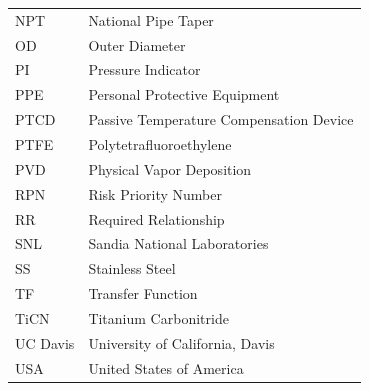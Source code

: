 \documentclass[12pt, letterpaper]{report}%
\newcounter{mycounter}           %
\newcounter{sub}[mycounter]      %
\newcommand{\device}{PTCD}
\begin{document}
\begin{longtable}{@{} l p{} @{}}
		NPT			& National Pipe Taper \\
		OD			& Outer Diameter \\
		PI			& Pressure Indicator \\
		PPE			& Personal Protective Equipment \\
		PTCD    & Passive Temperature Compensation Device \\
		PTFE		& Polytetrafluoroethylene \\ 
		PVD			& Physical Vapor Deposition \\ 
		RPN			& Risk Priority Number \\
		RR      & Required Relationship \\
		SNL     & Sandia National Laboratories \\
		SS			& Stainless Steel \\
		TF      & Transfer Function \\
		TiCN		& Titanium Carbonitride \\
		UC Davis & University of California, Davis \\
		USA			& United States of America \\
	\end{longtable}

\newpage  %


\begin{abstract}

	Modern engineering constantly requires advances in technological precision and reliability.
	Sandia National Laboratories, a United States security and energy research facility, conducts many experiments that depend on submillimeter-precision flow control of high-pressure hydrogen gas.
	Their experiments are sensitive to temperature fluctuations; the flow must be adjusted for various reasons to compensate for these changes.
	However, power and space constraints prohibit the use of electronic power or computer control systems, and existing passive flow control solutions do not approach the size and precision these experiments require.
	
	Sandia commissioned the Noble Aggie Labs from the University of California, Davis to design a Passive Temperature Compensation Device (PTCD)
	that adjusts gas flow in response to external temperature changes without electronics.
	Engineered to contain and restrict hydrogen or a noble gas at up to 700 times atmospheric pressure,
	the PTCD maintains a pin-sized orifice with microscopic precision. 
	It does so with a novel square-orifice valve architecture that is driven by an external, bimetallic actuator.

	This report summarizes the design objectives and final selected architecture of the \device for a nontechnical audience.
	Full design justification, verification, and tools for iteration can be found in the Final Design Report by the same authors\cite{ref_finalDesignReport}.

\end{abstract}
\end{document}
